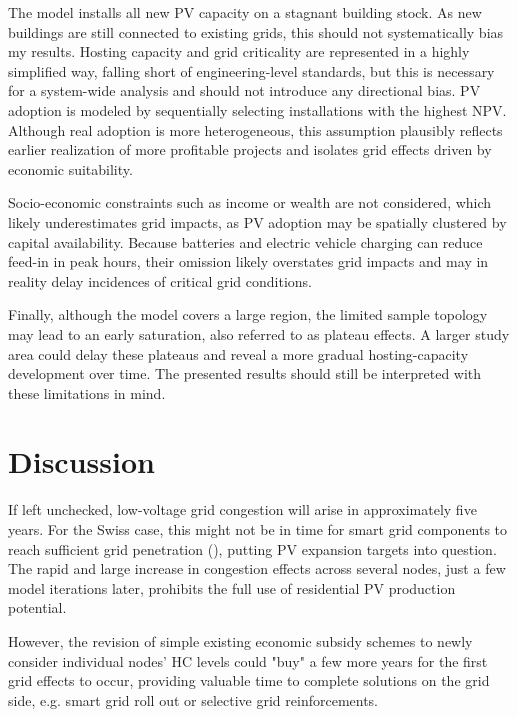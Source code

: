\documentclass[12PT, ]{article}
\begin{document}
The model installs all new PV capacity on a stagnant building stock. As new buildings are still connected to existing grids, this should not systematically bias my results. %
Hosting capacity and grid criticality are represented in a highly simplified way, falling short of engineering-level standards, but this is necessary for a system-wide analysis and should not introduce any directional bias.
%
PV adoption is modeled by sequentially selecting installations with the highest NPV. Although real adoption is more heterogeneous, this assumption plausibly reflects earlier realization of more profitable projects and isolates grid effects driven by economic suitability.

Socio-economic constraints such as income or wealth are not considered, which likely underestimates grid impacts, as PV adoption may be spatially clustered by capital availability.
%
Because batteries and electric vehicle charging can reduce feed-in in peak hours, their omission likely overstates grid impacts and may in reality delay incidences of critical grid conditions. 

Finally, although the model covers a large region, the limited sample topology may lead to an early saturation, also referred to as plateau effects. A larger study area could delay these plateaus and reveal a more gradual hosting-capacity development over time. 
The presented results should still be interpreted with these limitations in mind.


\section{Discussion} \label{sec:discussion}%
If left unchecked, low-voltage grid congestion will arise in approximately five years. For the Swiss case, this might not be in time for smart grid components to reach sufficient grid penetration (\cite{bfe_smartgridroadmap2015}), putting \cite{bfe_ep2050_2020} PV expansion targets into question. The rapid and large increase in congestion effects across several nodes, just a few model iterations later, prohibits the full use of residential PV production potential. 

However, the revision of simple existing economic subsidy schemes to newly consider individual nodes' HC levels could "buy" a few more years for the first grid effects to occur, providing valuable time to complete solutions on the grid side, e.g. smart grid roll out or selective grid reinforcements.
\end{document}
